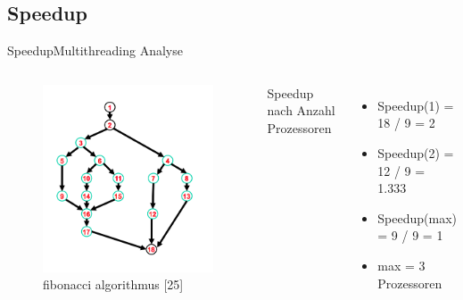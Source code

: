\documentclass{beamer}
\begin{document}
\subsection{Speedup}
\begin{frame}{Speedup}{Multithreading Analyse}
\begin{columns}
        \begin{figure}
        \centering
        \includegraphics[width=1\columnwidth]{./assets/gag.png}
        \caption{fibonacci algorithmus \cite{Herlihy1}[25]}
        \label{fig:my_label}
        \end{figure}
        
        
        Speedup nach Anzahl Prozessoren
        \begin{itemize}
        \item Speedup(1) = 18 / 9 = 2
        \item Speedup(2) = 12 / 9 = 1.333
        \item Speedup(max) = 9 / 9 = 1
        
        \item max = 3 Prozessoren
        \end{itemize}
    
\end{columns}
\end{frame}
\end{document}
